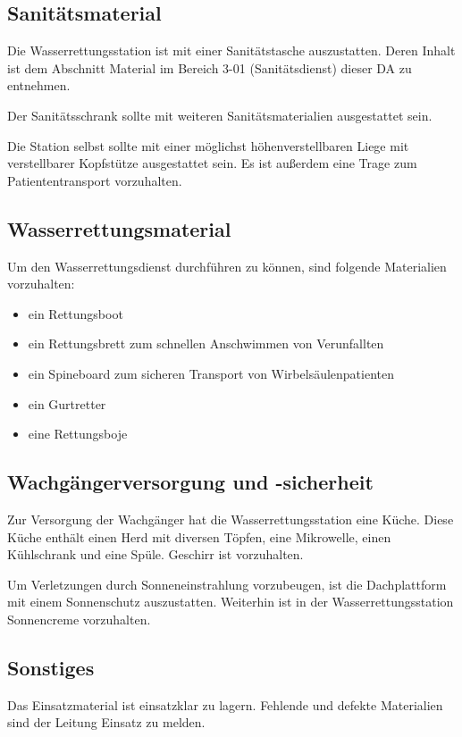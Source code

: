 \subsection*{Sanitätsmaterial}
Die Wasserrettungsstation ist mit einer Sanitätstasche auszustatten. Deren Inhalt ist dem Abschnitt Material im Bereich 3-01 (Sanitätsdienst) dieser DA zu entnehmen. 

Der Sanitätsschrank sollte mit weiteren Sanitätsmaterialien ausgestattet sein.

Die Station selbst sollte mit einer möglichst höhenverstellbaren Liege mit verstellbarer Kopfstütze ausgestattet sein. 
Es ist außerdem eine Trage zum Patiententransport vorzuhalten.

\subsection*{Wasserrettungsmaterial}
Um den Wasserrettungsdienst durchführen zu können, sind folgende Materialien vorzuhalten:\begin{itemize}
\item ein Rettungsboot
\item ein Rettungsbrett zum schnellen Anschwimmen von Verunfallten
\item ein Spineboard zum sicheren Transport von Wirbelsäulenpatienten
\item ein Gurtretter
\item eine Rettungsboje
\end{itemize}

\subsection*{Wachgängerversorgung und -sicherheit}
Zur Versorgung der Wachgänger hat die Wasserrettungsstation eine Küche. Diese Küche enthält einen Herd mit diversen Töpfen, eine Mikrowelle, einen Kühlschrank und eine Spüle. 
Geschirr ist vorzuhalten.

Um Verletzungen durch Sonneneinstrahlung vorzubeugen, ist die Dachplattform mit einem Sonnenschutz auszustatten. Weiterhin ist in der Wasserrettungsstation Sonnencreme vorzuhalten.

\subsection*{Sonstiges}
Das Einsatzmaterial ist einsatzklar zu lagern. Fehlende und defekte Materialien sind der Leitung Einsatz zu melden. 

